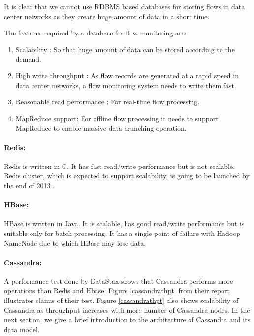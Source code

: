 	It is clear that we cannot use RDBMS based databases for storing flows in data center networks as they create huge amount of data in a short time. 

	The features required by a database for flow monitoring are:
	\begin{enumerate}
	  \item Scalability : So that huge amount of data can be stored according to the demand.
	  \item High write throughput : As flow records are generated at a rapid speed in data center networks, a flow monitoring system needs to write them fast.
	  \item Reasonable read performance : For real-time flow processing.
	  \item MapReduce support: For offline flow processing it needs to support MapReduce to enable massive data crunching operation.
	\end{enumerate}

	\paragraph{Redis:} Redis is written in C. It has fast read/write performance but is not scalable. Redis cluster, which is expected to support scalability, is going to be launched by the end of 2013 \cite{rrdcluster}. 
	\paragraph{HBase:} HBase is written in Java. It is scalable, has good read/write performance but is suitable only for batch processing. It has a single point of failure with Hadoop NameNode due to which HBase may lose data.

       \paragraph{Cassandra:} A performance test done by DataStax \cite{} shows that Cassandra performs more operations than Redis and Hbase. Figure \ref{cassandrathpt} from their report \cite{} illustrates claims of their test. Figure \ref{cassandrathpt} also shows scalability of Cassandra as 
	throughput increases with more number of Cassandra nodes. In the next section, we give a brief introduction to the architecture of Cassandra and its data model.

